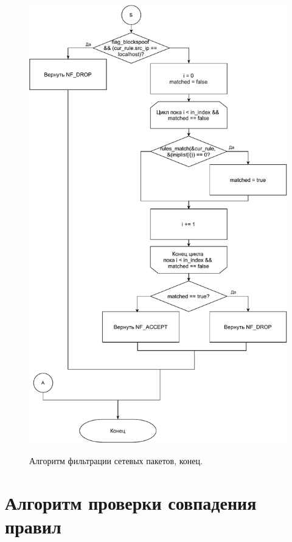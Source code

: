 \clearpage
\begin{figure}[h!]
	\begin{center}
		{\includegraphics[scale = 0.85]{inc/img/filter-2.pdf}}
		\caption{Алгоритм фильтрации сетевых пакетов, конец.}
		\label{img:filter-2}
	\end{center}
\end{figure}

\clearpage
\section{Алгоритм проверки совпадения правил}

